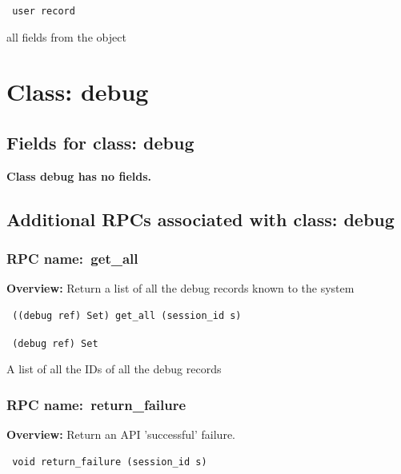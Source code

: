 \vspace{0.3cm}

{\tt 
user record
}


all fields from the object
\vspace{0.3cm}
\vspace{0.3cm}
\vspace{0.3cm}

\vspace{1cm}
\newpage
\section{Class: debug}
\subsection{Fields for class: debug}
{\bf Class debug has no fields.}
\subsection{Additional RPCs associated with class: debug}
\subsubsection{RPC name:~get\_all}

{\bf Overview:} 
Return a list of all the debug records known to the system

\begin{verbatim} ((debug ref) Set) get_all (session_id s)\end{verbatim}


\vspace{0.3cm}

{\tt 
(debug ref) Set
}


A list of all the IDs of all the debug records
\vspace{0.3cm}
\vspace{0.3cm}
\vspace{0.3cm}
\subsubsection{RPC name:~return\_failure}

{\bf Overview:} 
Return an API 'successful' failure.

\begin{verbatim} void return_failure (session_id s)\end{verbatim}


